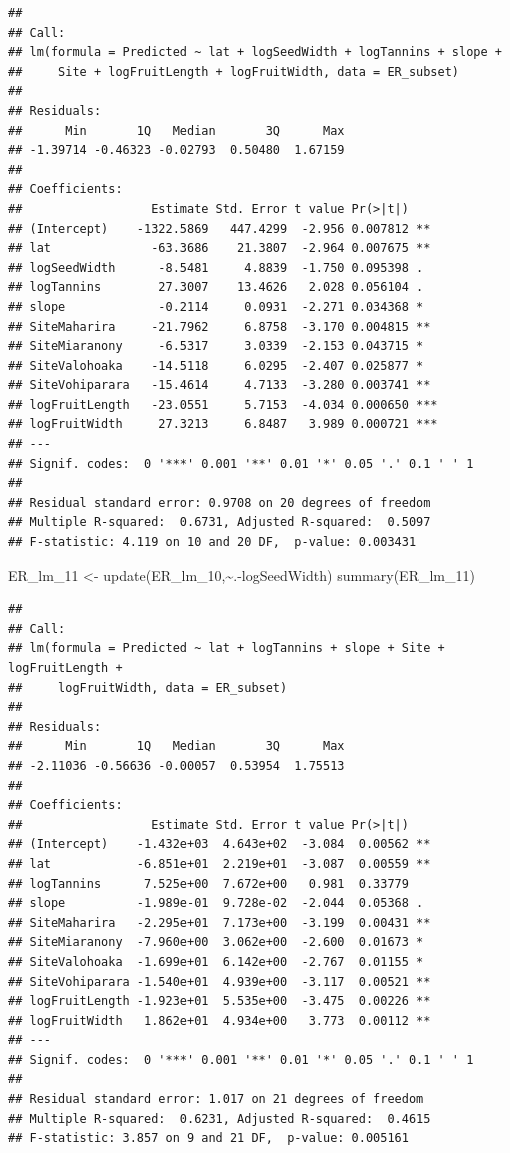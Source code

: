 \documentclass[
  12pt,
]{article}
\newenvironment{Shaded}{\begin{snugshade}}{\end{snugshade}}
\newcommand{\FunctionTok}[1]{\textcolor[rgb]{0.00,0.00,0.00}{#1}}
\newcommand{\NormalTok}[1]{#1}
\newcommand{\OtherTok}[1]{\textcolor[rgb]{0.56,0.35,0.01}{#1}}
\newcommand{\SpecialCharTok}[1]{\textcolor[rgb]{0.00,0.00,0.00}{#1}}
\begin{document}
\begin{verbatim}
## 
## Call:
## lm(formula = Predicted ~ lat + logSeedWidth + logTannins + slope + 
##     Site + logFruitLength + logFruitWidth, data = ER_subset)
## 
## Residuals:
##      Min       1Q   Median       3Q      Max 
## -1.39714 -0.46323 -0.02793  0.50480  1.67159 
## 
## Coefficients:
##                  Estimate Std. Error t value Pr(>|t|)    
## (Intercept)    -1322.5869   447.4299  -2.956 0.007812 ** 
## lat              -63.3686    21.3807  -2.964 0.007675 ** 
## logSeedWidth      -8.5481     4.8839  -1.750 0.095398 .  
## logTannins        27.3007    13.4626   2.028 0.056104 .  
## slope             -0.2114     0.0931  -2.271 0.034368 *  
## SiteMaharira     -21.7962     6.8758  -3.170 0.004815 ** 
## SiteMiaranony     -6.5317     3.0339  -2.153 0.043715 *  
## SiteValohoaka    -14.5118     6.0295  -2.407 0.025877 *  
## SiteVohiparara   -15.4614     4.7133  -3.280 0.003741 ** 
## logFruitLength   -23.0551     5.7153  -4.034 0.000650 ***
## logFruitWidth     27.3213     6.8487   3.989 0.000721 ***
## ---
## Signif. codes:  0 '***' 0.001 '**' 0.01 '*' 0.05 '.' 0.1 ' ' 1
## 
## Residual standard error: 0.9708 on 20 degrees of freedom
## Multiple R-squared:  0.6731, Adjusted R-squared:  0.5097 
## F-statistic: 4.119 on 10 and 20 DF,  p-value: 0.003431
\end{verbatim}

\begin{Shaded}
\begin{Highlighting}[]
\NormalTok{ER\_lm\_11 }\OtherTok{\textless{}{-}} \FunctionTok{update}\NormalTok{(ER\_lm\_10,}\SpecialCharTok{\textasciitilde{}}\NormalTok{.}\SpecialCharTok{{-}}\NormalTok{logSeedWidth)}
\FunctionTok{summary}\NormalTok{(ER\_lm\_11)}
\end{Highlighting}
\end{Shaded}

\begin{verbatim}
## 
## Call:
## lm(formula = Predicted ~ lat + logTannins + slope + Site + logFruitLength + 
##     logFruitWidth, data = ER_subset)
## 
## Residuals:
##      Min       1Q   Median       3Q      Max 
## -2.11036 -0.56636 -0.00057  0.53954  1.75513 
## 
## Coefficients:
##                  Estimate Std. Error t value Pr(>|t|)   
## (Intercept)    -1.432e+03  4.643e+02  -3.084  0.00562 **
## lat            -6.851e+01  2.219e+01  -3.087  0.00559 **
## logTannins      7.525e+00  7.672e+00   0.981  0.33779   
## slope          -1.989e-01  9.728e-02  -2.044  0.05368 . 
## SiteMaharira   -2.295e+01  7.173e+00  -3.199  0.00431 **
## SiteMiaranony  -7.960e+00  3.062e+00  -2.600  0.01673 * 
## SiteValohoaka  -1.699e+01  6.142e+00  -2.767  0.01155 * 
## SiteVohiparara -1.540e+01  4.939e+00  -3.117  0.00521 **
## logFruitLength -1.923e+01  5.535e+00  -3.475  0.00226 **
## logFruitWidth   1.862e+01  4.934e+00   3.773  0.00112 **
## ---
## Signif. codes:  0 '***' 0.001 '**' 0.01 '*' 0.05 '.' 0.1 ' ' 1
## 
## Residual standard error: 1.017 on 21 degrees of freedom
## Multiple R-squared:  0.6231, Adjusted R-squared:  0.4615 
## F-statistic: 3.857 on 9 and 21 DF,  p-value: 0.005161
\end{verbatim}
\end{document}
